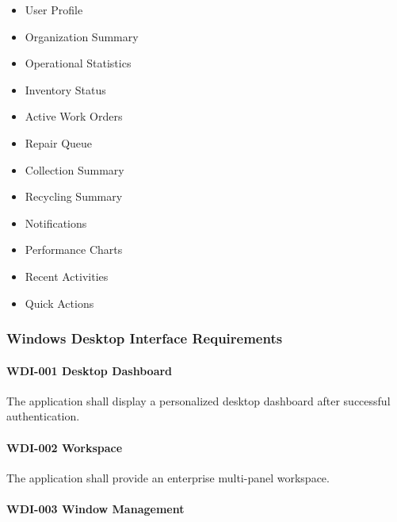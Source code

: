 \begin{itemize}

\item User Profile

\item Organization Summary

\item Operational Statistics

\item Inventory Status

\item Active Work Orders

\item Repair Queue

\item Collection Summary

\item Recycling Summary

\item Notifications

\item Performance Charts

\item Recent Activities

\item Quick Actions

\end{itemize}


\subsubsection*{Windows Desktop Interface Requirements}

\paragraph{WDI-001 Desktop Dashboard}

The application shall display a personalized desktop dashboard after
successful authentication.

\paragraph{WDI-002 Workspace}

The application shall provide an enterprise multi-panel workspace.

\paragraph{WDI-003 Window Management}

